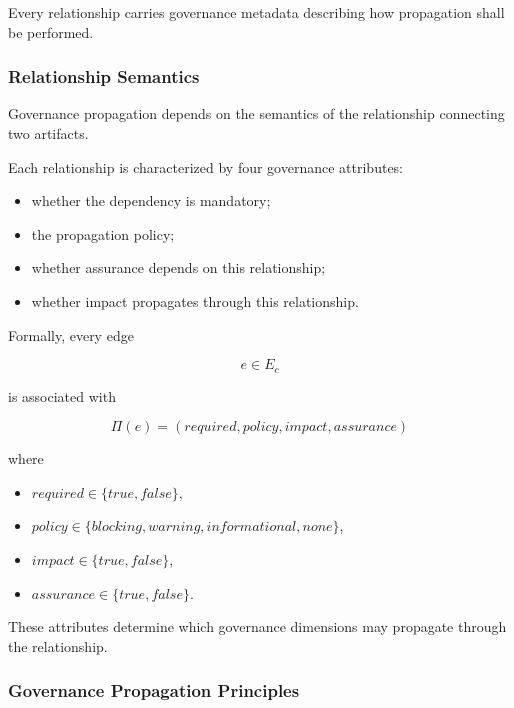 \documentclass[10pt]{article}
\begin{document}
Every relationship carries governance metadata describing how propagation shall
be performed.

\subsubsection{Relationship Semantics}

Governance propagation depends on the semantics of the relationship connecting
two artifacts.

Each relationship is characterized by four governance attributes:

\begin{itemize}
    \item whether the dependency is mandatory;
    \item the propagation policy;
    \item whether assurance depends on this relationship;
    \item whether impact propagates through this relationship.
\end{itemize}

Formally, every edge

\[
e\in E_c
\]

is associated with

\begin{equation}
\Pi(e)=
(
required,
policy,
impact,
assurance
)
\label{eq:relationship_policy}
\end{equation}

where

\begin{itemize}
    \item $required\in\{true,false\}$,
    \item $policy\in
    \{
    blocking,
    warning,
    informational,
    none
    \}$,
    \item $impact\in\{true,false\}$,
    \item $assurance\in\{true,false\}$.
\end{itemize}

These attributes determine which governance dimensions may propagate through
the relationship.

\subsubsection{Governance Propagation Principles}
\end{document}
